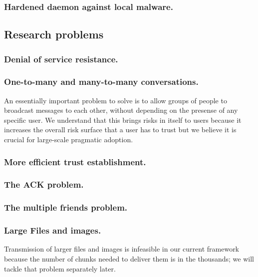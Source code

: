 \subsubsection{Hardened daemon against local malware.}

\subsection{Research problems}

\subsubsection{Denial of service resistance.}

\subsubsection{One-to-many and many-to-many conversations.} An essentially important problem to solve is to allow groups of people to broadcast messages to each other, without depending on the presense of any specific user. We understand that this brings risks in itself to users because it increases the overall risk surface that a user has to trust but we believe it is crucial for large-scale pragmatic adoption.

\subsubsection{More efficient trust establishment.}

\subsubsection{The ACK problem.}

\subsubsection{The multiple friends problem.}

\subsubsection{Large Files and images.} Transmission of larger files and images is infeasible in our current framework because the number of chunks needed to deliver them is in the thousands; we will tackle that problem separately later.
